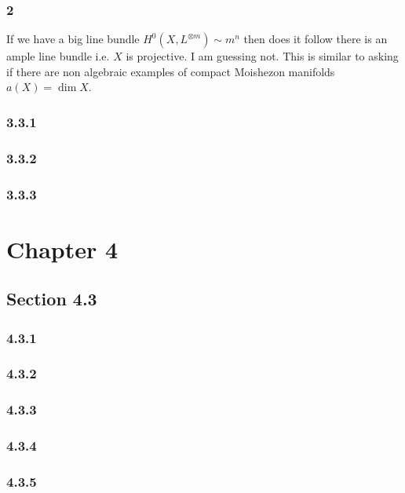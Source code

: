 \documentclass[12pt]{article}
\begin{document}
\subsubsection{2}

If we have a big line bundle $H^0(X, L^{\otimes m}) \sim m^n$ then does it follow there is an ample line bundle i.e. $X$ is projective. I am guessing not. This is similar to asking if there are non algebraic examples of compact Moishezon manifolds $a(X) = \dim{X}$.

\subsubsection{3.3.1}

\subsubsection{3.3.2}



\subsubsection{3.3.3}


\section{Chapter 4}

\subsection{Section 4.3}

\subsubsection{4.3.1}

\subsubsection{4.3.2}

\subsubsection{4.3.3}

\subsubsection{4.3.4}

\subsubsection{4.3.5}
\end{document}
